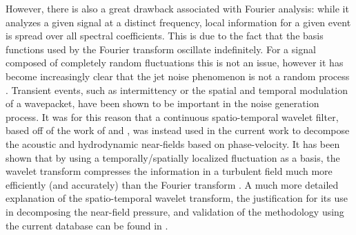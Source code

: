 However, there is also a great drawback associated with Fourier analysis: while it analyzes a given signal at a distinct frequency, local information for a given event is spread over all spectral coefficients. 
This is due to the fact that the basis functions used by the Fourier transform oscillate indefinitely. 
For a signal composed of completely random fluctuations this is not an issue, however it has become increasingly clear that the jet noise phenomenon is not a random process \citep{Kearney-Fischer2013}.
Transient events, such as intermittency or the spatial and temporal modulation of a wavepacket, have been shown to be important in the noise generation process. 
It was for this reason that a continuous spatio-temporal wavelet filter, based off of the work of \cite{Antoine2004} and \cite{Kikuchi2010}, was instead used in the current work to decompose the acoustic and hydrodynamic near-fields based on phase-velocity.
It has been shown that by using a temporally/spatially localized fluctuation as a basis, the wavelet transform compresses the information in a turbulent field much more efficiently (and accurately) than the Fourier transform \citep{Farge1992}.
A much more detailed explanation of the spatio-temporal wavelet transform, the justification for its use in decomposing the near-field pressure, and validation of the methodology using the current database can be found in \citet{Crawley2016}. 

